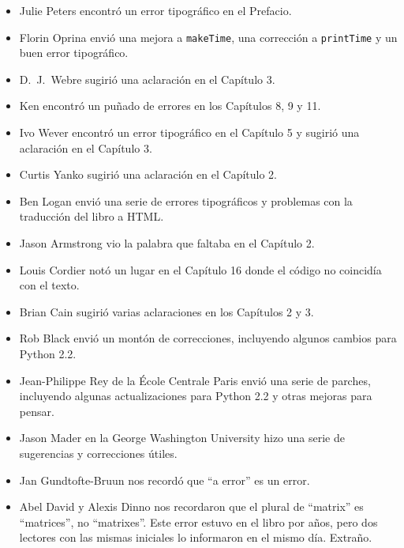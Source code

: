 \documentclass[10pt]{book}
\begin{document}
\begin{itemize}
\item Julie Peters encontró un error tipográfico en el Prefacio.

\item Florin Oprina envió una mejora a {\tt makeTime},
una corrección a {\tt printTime} y un buen error tipográfico.

\item D.~J.~Webre sugirió una aclaración en el Capítulo 3.

\item Ken encontró un puñado de errores en los Capítulos 8, 9 y 11.

\item Ivo Wever encontró un error tipográfico en el Capítulo 5 y sugirió una aclaración
en el Capítulo 3.

\item Curtis Yanko sugirió una aclaración en el Capítulo 2.

\item Ben Logan envió una serie de errores tipográficos y problemas con la traducción
del libro a HTML.

\item Jason Armstrong vio la palabra que faltaba en el Capítulo 2.

\item Louis Cordier notó un lugar en el Capítulo 16 donde el código
no coincidía con el texto.

\item Brian Cain sugirió varias aclaraciones en los Capítulos 2 y 3.

\item Rob Black envió un montón de correcciones, incluyendo algunos
cambios para Python 2.2.

\item Jean-Philippe Rey de la \'{E}cole Centrale
Paris envió una serie de parches, incluyendo algunas actualizaciones para Python 2.2
y otras mejoras para pensar.

\item Jason Mader en la George Washington University hizo una serie 
de sugerencias y correcciones útiles.

\item Jan Gundtofte-Bruun nos recordó que ``a error'' es un error.

\item Abel David y Alexis Dinno nos recordaron que el plural de
``matrix'' es ``matrices'', no ``matrixes''.  Este error estuvo en el
libro por años, pero dos lectores con las mismas iniciales lo informaron en
el mismo día. Extraño.


\end{itemize}
\end{document}
